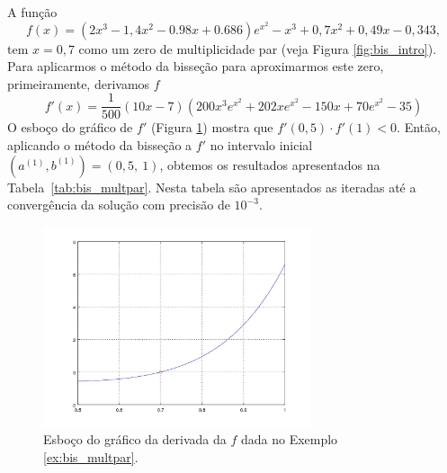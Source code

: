 \begin{ex}\label{ex:bis_multpar}
  A função
  \begin{equation}
    f(x) = (2x^3-1,4x^2-0.98x+0.686)e^{x^2} - x^3 + 0,7x^2 + 0,49x - 0,343,
  \end{equation}
tem $x=0,7$ como um zero de multiplicidade par (veja Figura \ref{fig:bis_intro}). Para aplicarmos o método da bisseção para aproximarmos este zero, primeiramente, derivamos $f$
\begin{equation}
  f'(x) = \frac{1}{500} \left(10 x - 7\right) \left(200 x^{3} e^{x^{2}} + 202 x e^{x^{2}} - 150 x + 70 e^{x^{2}} - 35\right)
\end{equation}
O esboço do gráfico de $f'$ (Figura \ref{fig:bis_multpar}) mostra que $f'(0,5)\cdot f'(1) < 0$. Então, aplicando o método da bisseção a $f'$ no intervalo inicial $(a^{(1)}, b^{(1)}) = (0,5, ~1)$, obtemos os resultados apresentados na Tabela~\ref{tab:bis_multpar}. Nesta tabela são apresentados as iteradas até a convergência da solução com precisão de $10^{-3}$.

\begin{figure}[h!]
  \centering
  \includegraphics[width=0.7\textwidth]{./cap_eq1d/dados/ex_bis_multpar/fig_bis_multpar}
  \caption{Esboço do gráfico da derivada da $f$ dada no Exemplo \ref{ex:bis_multpar}.}
  \label{fig:bis_multpar}
\end{figure}
\end{ex}

